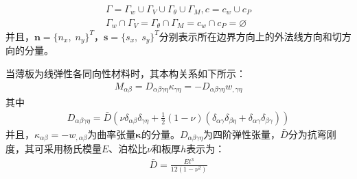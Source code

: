\documentclass[a4paper]{article}
\begin{document}
\begin{equation}
    \begin{split}
        \Gamma=\Gamma_w\cup\Gamma_V\cup\Gamma_{\theta}\cup\Gamma_M,c=c_w\cup c_P\\
        \Gamma_w\cap\Gamma_V=\Gamma_{\theta}\cap\Gamma_M=c_w\cap c_P=\varnothing
    \end{split}
\end{equation}
并且，$\pmb{n}=\{n_x,\; n_y\}^T$，$\pmb{s}=\{s_x,\; s_y\}^T$分别表示所在边界方向上的外法线方向和切方向的分量。\par
当薄板为线弹性各同向性材料时，其本构关系如下所示：
\begin{equation}
    \begin{split}
        M_{\alpha\beta}=D_{\alpha\beta\gamma\eta}\kappa_{\gamma\eta}=-D_{\alpha\beta\gamma\eta}w_{,\gamma\eta}
    \end{split}
\end{equation}
其中
\begin{equation}
    \begin{split}
        D_{\alpha\beta\gamma\eta}=\bar D(\nu\delta_{\alpha\beta}\delta_{\gamma\eta}+\frac{1}{2}(1-\nu)(\delta_{\alpha\gamma}\delta_{\beta\eta}+\delta_{\alpha\gamma}\delta_{\beta\gamma}))
    \end{split}
\end{equation}
并且，$\kappa_{\alpha\beta}=-w_{,\alpha\beta}$为曲率张量$\boldsymbol \kappa$的分量。$D_{\alpha \beta \gamma \eta}$为四阶弹性张量，$\bar{D}$分为抗弯刚度，其可采用杨氏模量$E$、泊松比$\nu$和板厚$h$表示为：
\begin{equation}
    \begin{split}
    \bar D=\frac{Et^3}{12(1-\nu^2)}
    \end{split}
    \end{equation}\par
\end{document}

